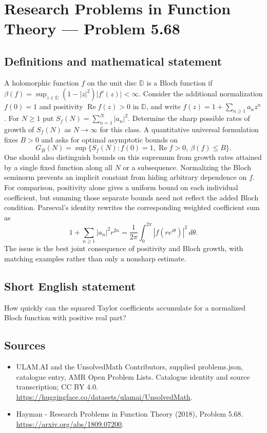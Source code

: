 \documentclass[11pt,a4paper]{article}
\begin{document}
\section*{Research Problems in Function Theory — Problem 5.68}\label{statement}

\subsection{Definitions and mathematical statement}
A holomorphic function $f$ on the unit disc $\mathbb D$ is a Bloch function if
$\beta(f)=\sup_{z\in\mathbb D}(1-|z|^2)|f'(z)|<\infty$.
Consider the additional normalization $f(0)=1$ and positivity $\operatorname{Re}f(z)>0$ in $\mathbb D$, and write $f(z)=1+\sum_{n\ge1}a_nz^n$.
For $N\ge1$ put $S_f(N)=\sum_{n=1}^N|a_n|^2$.
Determine the sharp possible rates of growth of $S_f(N)$ as $N\to\infty$ for this class. A quantitative universal formulation fixes $B>0$ and asks for optimal asymptotic bounds on
\[
G_B(N)=\sup\{S_f(N):f(0)=1, \operatorname{Re}f>0,\ \beta(f)\le B\}.
\]
One should also distinguish bounds on this supremum from growth rates attained by a single fixed function along all $N$ or a subsequence. Normalizing the Bloch seminorm prevents an implicit constant from hiding arbitrary dependence on $f$.
For comparison, positivity alone gives a uniform bound on each individual coefficient, but summing those separate bounds need not reflect the added Bloch condition. Parseval's identity rewrites the corresponding weighted coefficient sum as
\[
1+\sum_{n\ge1}|a_n|^2r^{2n}
=\frac1{2\pi}\int_0^{2\pi}|f(re^{i\theta})|^2\,d\theta.
\]
The issue is the best joint consequence of positivity and Bloch growth, with matching examples rather than only a nonsharp estimate.
\subsection{Short English statement}
How quickly can the squared Taylor coefficients accumulate for a normalized Bloch function with positive real part?
\subsection{Sources}
\begin{itemize}
\item[S1] ULAM.AI and the UnsolvedMath Contributors, supplied problems.json, catalogue entry, AMR Open Problem Lists. Catalogue identity and source transcription; CC BY 4.0.
\url{https://huggingface.co/datasets/ulamai/UnsolvedMath}.
\item[S2] Hayman - Research Problems in Function Theory (2018), Problem 5.68. 
\url{https://arxiv.org/abs/1809.07200}.
\end{itemize}
\end{document}
